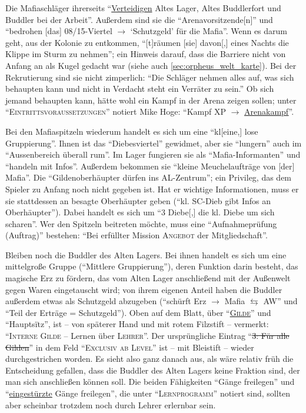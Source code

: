 \documentclass[a5paper,pagesize,numbers=noenddot]{scrbook}
\begin{document}
Die Mafiaschläger ihrerseits \enquote{\uline{Verteidigen} Altes Lager, Altes Buddlerfort und Buddler bei der Arbeit}.
Außerdem sind sie die \enquote{Arenavorsitzende[n]} und \enquote{bedrohen [das] 08/15-Viertel $\rightarrow$ \enquote{Schutzgeld} für die Mafia}.
Wenn es darum geht, aus der Kolonie zu entkommen, \enquote{[t]räumen [sie] davon[,] eines Nachts die Klippe im Sturm zu nehmen}; ein Hinweis darauf, dass die Barriere nicht von Anfang an als Kugel gedacht war (siehe auch \autoref{sec:orpheus_welt_karte}).
Bei der Rekrutierung sind sie nicht zimperlich:
\enquote{Die Schläger nehmen alles auf, was sich behaupten kann und nicht in Verdacht steht ein Verräter zu sein.}
Ob sich jemand behaupten kann, hätte wohl ein Kampf in der Arena zeigen sollen; unter \enquote{\textsc{Eintrittsvoraussetzungen}} notiert Mike Hoge:
\enquote{Kampf XP $\rightarrow$ \uline{Arenakampf}}.\autocite[S.~4]{orpheus_gildensystem}

Bei den Mafiaspitzeln wiederum handelt es sich um eine \enquote{kl[eine,] lose Gruppierung}.
Ihnen ist das \enquote{Diebesviertel} gewidmet, aber sie \enquote{lungern} auch im \enquote{Aussenbereich überall rum}.
Im Lager fungieren sie als \enquote{Mafia-Informanten} und \enquote{handeln mit Infos}.
Außerdem bekommen sie \enquote{kleine Meuchelaufträge von [der] Mafia}.
Die \enquote{Gildenoberhäupter dürfen ins AL-Zentrum}; ein Privileg, das dem Spieler zu Anfang noch nicht gegeben ist.
Hat er wichtige Informationen, muss er sie stattdessen an besagte Oberhäupter geben (\enquote{kl. SC-Dieb gibt Infos an Oberhäupter}).
Dabei handelt es sich um \enquote{3 Diebe[,] die kl. Diebe um sich scharen}.
Wer den Spitzeln beitreten möchte, muss eine \enquote{Aufnahmeprüfung (Auftrag)} bestehen:
\enquote{Bei erfüllter Mission \textsc{Angebot} der Mitgliedschaft}.\autocite[S.~5]{orpheus_gildensystem}

Bleiben noch die Buddler des Alten Lagers.
Bei ihnen handelt es sich um eine mittelgroße Gruppe (\enquote{Mittlere Gruppierung}), deren Funktion darin besteht, das magische Erz zu fördern, das vom Alten Lager anschließend mit der Außenwelt gegen Waren eingetauscht wird; von ihrem eigenen Anteil haben die Buddler außerdem etwas als Schutzgeld abzugeben (\enquote{schürft Erz $\rightarrow$ Mafia $\leftrightarrows$ AW} und \enquote{Teil der Erträge = Schutzgeld}).
Oben auf dem Blatt, über \enquote{\textsc{\uline{Gilde}}} und \enquote{Hauptsïtz}, ist -- von späterer Hand und mit rotem Filzstift -- vermerkt:
\enquote{\textsc{Interne Gilde} -- Lernen über \textsc{Lehrer}}.
Der ursprüngliche Eintrag \enquote{\sout{3: Für alle Gilden}} in dem Feld \enquote{\textsc{Exclusiv ab Level}} ist -- mit Bleistift -- wieder durchgestrichen worden.
Es sieht also ganz danach aus, als wäre relativ früh die Entscheidung gefallen, dass die Buddler des Alten Lagers keine Fraktion sind, der man sich anschließen können soll.
Die beiden Fähigkeiten \enquote{Gänge freilegen} und \enquote{\uline{eingestürzte} Gänge freilegen}, die unter \enquote{\textsc{Lernprogramm}} notiert sind, sollten aber scheinbar trotzdem noch durch Lehrer erlernbar sein.\autocite[S.~5]{orpheus_gildensystem}
\end{document}
